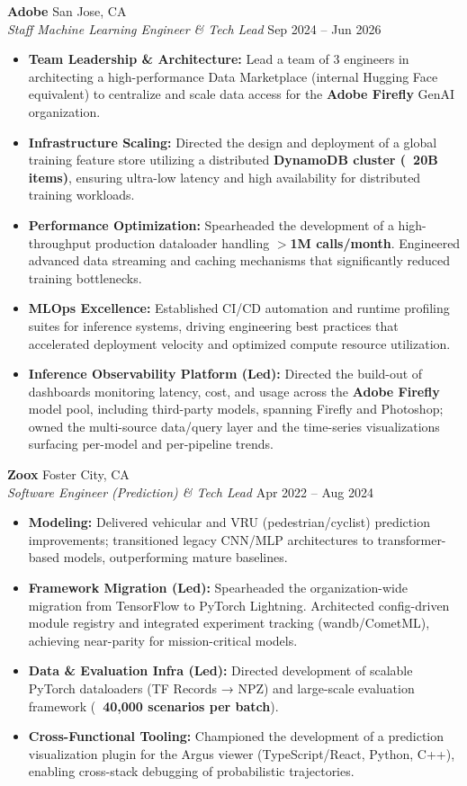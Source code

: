 \documentclass[10pt,letterpaper]{article}
\begin{document}
\textbf{Adobe} \hfill San Jose, CA \\
\textit{Staff Machine Learning Engineer \& Tech Lead} \hfill Sep 2024 -- Jun 2026
\begin{itemize}
    \item \textbf{Team Leadership \& Architecture:} Lead a team of 3 engineers in architecting a high-performance Data Marketplace (internal Hugging Face equivalent) to centralize and scale data access for the \textbf{Adobe Firefly} GenAI organization.
    \item \textbf{Infrastructure Scaling:} Directed the design and deployment of a global training feature store utilizing a distributed \textbf{DynamoDB cluster (~20B items)}, ensuring ultra-low latency and high availability for distributed training workloads.
    \item \textbf{Performance Optimization:} Spearheaded the development of a high-throughput production dataloader handling \textbf{$>$1M calls/month}. Engineered advanced data streaming and caching mechanisms that significantly reduced training bottlenecks.
    \item \textbf{MLOps Excellence:} Established CI/CD automation and runtime profiling suites for inference systems, driving engineering best practices that accelerated deployment velocity and optimized compute resource utilization.
    \item \textbf{Inference Observability Platform (Led):} Directed the build-out of dashboards monitoring latency, cost, and usage across the \textbf{Adobe Firefly} model pool, including third-party models, spanning Firefly and Photoshop; owned the multi-source data/query layer and the time-series visualizations surfacing per-model and per-pipeline trends.
\end{itemize}

\textbf{Zoox} \hfill Foster City, CA \\
\textit{Software Engineer (Prediction) \& Tech Lead} \hfill Apr 2022 -- Aug 2024
\begin{itemize}
    \item \textbf{Modeling:} Delivered vehicular and VRU (pedestrian/cyclist) prediction improvements; transitioned legacy CNN/MLP architectures to transformer-based models, outperforming mature baselines.
    \item \textbf{Framework Migration (Led):} Spearheaded the organization-wide migration from TensorFlow to PyTorch Lightning. Architected config-driven module registry and integrated experiment tracking (wandb/CometML), achieving near-parity for mission-critical models.
    \item \textbf{Data \& Evaluation Infra (Led):} Directed development of scalable PyTorch dataloaders (TF Records → NPZ) and large-scale evaluation framework (\textbf{~40,000 scenarios per batch}).
    \item \textbf{Cross-Functional Tooling:} Championed the development of a prediction visualization plugin for the Argus viewer (TypeScript/React, Python, C++), enabling cross-stack debugging of probabilistic trajectories.
\end{itemize}
\end{document}
